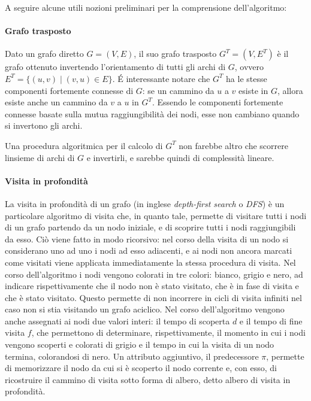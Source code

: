 A seguire alcune utili nozioni preliminari per la comprensione dell'algoritmo:

\paragraph{Grafo trasposto}
Dato un grafo diretto $G = (V, E)$, il suo grafo trasposto $G^T = (V, E^T)$ \`e il grafo ottenuto invertendo
l'orientamento di tutti gli archi di $G$, ovvero $E^T = \{(u, v) \mid (v, u) \in E\}$.
 \'E interessante notare che $G^T$ ha le stesse componenti fortemente connesse di $G$: se un cammino da $u$ a $v$
esiste in $G$, allora esiste anche un cammino da $v$ a $u$ in $G^T$.
Essendo le componenti fortemente connesse basate sulla mutua raggiungibilit\`a dei nodi, esse non cambiano
quando si invertono gli archi.

Una procedura algoritmica per il calcolo di $G^T$ non farebbe altro che scorrere linsieme di archi di $G$ e
invertirli, e sarebbe quindi di complessit\`a lineare.

\paragraph{Visita in profondit\`a}
La visita in profondit\`a di un grafo (in inglese \textit{depth-first search} o \textit{DFS}) \`e un particolare
algoritmo di visita che, in quanto tale, permette di visitare tutti i nodi di un grafo partendo da un nodo iniziale,
e di scoprire tutti i nodi raggiungibili da esso.
Ci\`o viene fatto in modo ricorsivo: nel corso della visita di un nodo si considerano uno ad uno i nodi ad esso
adiacenti, e ai nodi non ancora marcati come visitati viene applicata immediatamente la stessa procedura di visita.
Nel corso dell'algoritmo i nodi vengono colorati in tre colori: bianco, grigio e nero, ad indicare rispettivamente
che il nodo non \`e stato visitato, che \`e in fase di visita e che \`e stato visitato.
Questo permette di non incorrere in cicli di visita infiniti nel caso non si stia visitando un grafo aciclico.
Nel corso dell'algoritmo vengono anche assegnati ai nodi due valori interi: il tempo di scoperta $d$ e il tempo di
fine visita $f$, che permettono di determinare, rispettivamente, il momento in cui i nodi vengono scoperti e colorati
di grigio e il tempo in cui la visita di un nodo termina, colorandosi di nero.
Un attributo aggiuntivo, il predecessore $\pi$, permette di memorizzare il nodo da cui si \`e scoperto il nodo
corrente e, con esso, di ricostruire il cammino di visita sotto forma di albero, detto albero di visita in profondit\`a.


